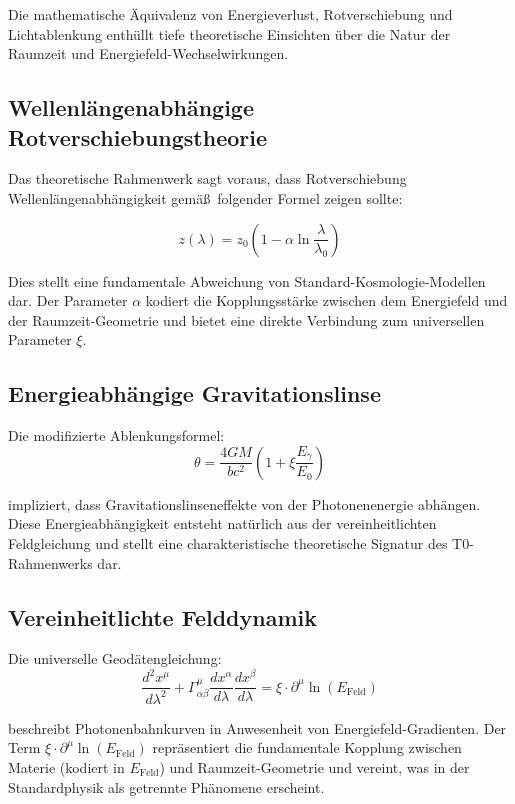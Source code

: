 \documentclass[12pt,a4paper]{article}
\newcommand{\efield}{E_{\text{Feld}}}
\theoremstyle{definition}
\begin{document}
	Die mathematische \"Aquivalenz von Energieverlust, Rotverschiebung und Lichtablenkung enth\"ullt tiefe theoretische Einsichten \"uber die Natur der Raumzeit und Energiefeld-Wechselwirkungen.
	
	\subsection{Wellenl\"angenabh\"angige Rotverschiebungstheorie}

Das theoretische Rahmenwerk sagt voraus, dass Rotverschiebung Wellenl\"angenabh\"angigkeit gem\"a\ss\ folgender Formel zeigen sollte:

\begin{equation}
	z(\lambda) = z_0\left(1 - \alpha \ln\frac{\lambda}{\lambda_0}\right)
\end{equation}

Dies stellt eine fundamentale Abweichung von Standard-Kosmologie-Modellen dar. Der Parameter $\alpha$ kodiert die Kopplungsst\"arke zwischen dem Energiefeld und der Raumzeit-Geometrie und bietet eine direkte Verbindung zum universellen Parameter $\xi$.

	\subsection{Energieabh\"angige Gravitationslinse}
	
	Die modifizierte Ablenkungsformel:
	\begin{equation}
		\theta = \frac{4GM}{bc^2}\left(1 + \xi \frac{E_\gamma}{E_0}\right)
	\end{equation}
	
	impliziert, dass Gravitationslinseneffekte von der Photonenenergie abh\"angen. Diese Energieabh\"angigkeit entsteht nat\"urlich aus der vereinheitlichten Feldgleichung und stellt eine charakteristische theoretische Signatur des T0-Rahmenwerks dar.
	
	\subsection{Vereinheitlichte Felddynamik}
	
	Die universelle Geod\"atengleichung:
	\begin{equation}
		\frac{d^2 x^\mu}{d\lambda^2} + \Gamma^\mu_{\alpha\beta}\frac{dx^\alpha}{d\lambda}\frac{dx^\beta}{d\lambda} = \xi \cdot \partial^\mu \ln(\efield)
	\end{equation}
	
	beschreibt Photonenbahnkurven in Anwesenheit von Energiefeld-Gradienten. Der Term $\xi \cdot \partial^\mu \ln(\efield)$ repr\"asentiert die fundamentale Kopplung zwischen Materie (kodiert in $\efield$) und Raumzeit-Geometrie und vereint, was in der Standardphysik als getrennte Ph\"anomene erscheint.
	
\end{document}
